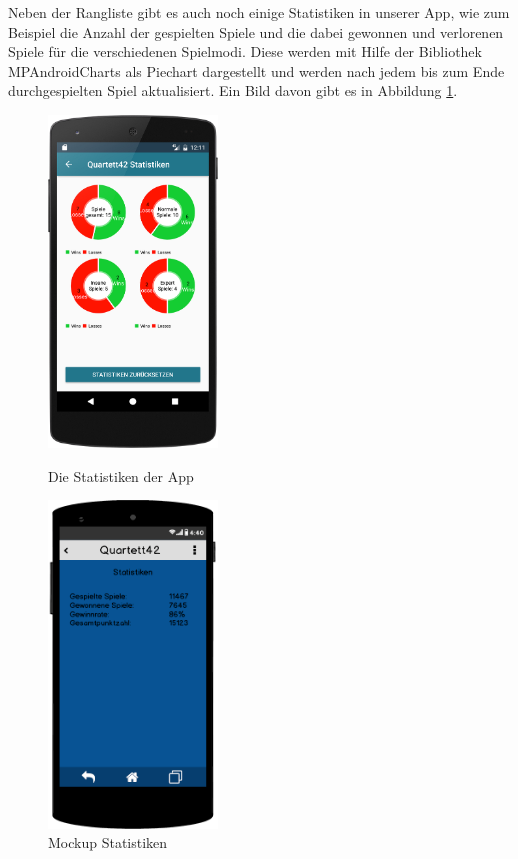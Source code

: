Neben der Rangliste gibt es auch noch einige Statistiken in unserer App, wie zum Beispiel die Anzahl der gespielten Spiele und die dabei gewonnen und verlorenen Spiele für die verschiedenen Spielmodi. Diese werden mit Hilfe der Bibliothek MPAndroidCharts als Piechart dargestellt und werden nach jedem bis zum Ende durchgespielten Spiel aktualisiert. Ein Bild davon gibt es in Abbildung \ref{figure:implementierungstatistiken}.\\

\begin{figure}[h]
    \centering
    \begin{minipage}{0.49\textwidth}
        \centering
        \includegraphics[width=0.4\textwidth]{img/screenshots/device_statistics.png}
		\caption{Die Statistiken der App}
		\label{figure:implementierungstatistiken}
	\end{minipage}
    \begin{minipage}{0.49\textwidth}
        \centering
        \includegraphics[width=0.4\textwidth]{img/mockups/statistiken.png}
        \caption{Mockup Statistiken}
    \end{minipage}
\end{figure}


